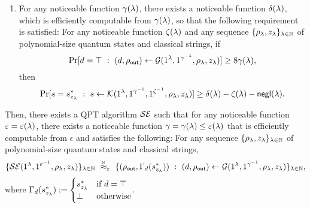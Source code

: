 \begin{lemma}
\begin{enumerate}
    \item \label{item:gamma_delta} 
 For any noticeable function $\gamma(\lambda)$, there exists a noticeable function $\delta(\lambda)$, 
 which is efficiently computable from $\gamma(\lambda)$, so that the following requirement is satisfied: For 
 any noticeable function $\zeta(\lambda)$ and
 any sequence $\{\rho_\lambda,{z_\lambda}\}_{\lambda\in\mathbb{N}}$ of polynomial-size quantum states and classical strings, %
 if 
$$
\Pr[d=\top ~:~ (d,\rho_{\mathsf{out}}) \leftarrow \mathcal{G}(1^\lambda,1^{\gamma^{-1}},\rho_\lambda,{z_\lambda})]\geq  8\gamma(\lambda), 
$$  
then 
$$
\Pr[s =s^*_{{z_\lambda}}~:~ s\leftarrow \mathcal{K}(1^\lambda,1^{\gamma^{-1}}, 1^{\zeta^{-1}}, \rho_\lambda,{z_\lambda})]\geq   \delta(\lambda)-\zeta(\lambda)-\mathsf{negl}(\lambda).
$$
\end{enumerate}
Then, there exists a QPT algorithm $\mathcal{SE}$ such that for any noticeable function $\varepsilon=\varepsilon(\lambda)$, there exists a noticeable function $\gamma=\gamma(\lambda)\le \varepsilon(\lambda)$ that is efficiently computable from $\epsilon$ and satisfies the following:
For any sequence $\{\rho_\lambda,{z_\lambda}\}_{\lambda\in\mathbb{N}}$ of polynomial-size quantum states and classical strings,  
$$
\{\mathcal{SE}(1^\lambda,1^{\varepsilon^{-1}},\rho_\lambda,{z_\lambda})\}_{\lambda \in \mathbb{N}}
~\stackrel{\text{s}}{\approx}_{\varepsilon}~ 
\{(\rho_{\mathsf{out}},\Gamma_d(s^*_{{z_\lambda}}))~:~(d,\rho_{\mathsf{out}})\leftarrow \mathcal{G}(1^\lambda,1^{\gamma^{-1}},\rho_\lambda,{z_{\lambda}})\}_{\lambda \in \mathbb{N}},
$$
where  $
\Gamma_d(s^*_{{z_\lambda}}):= 
\begin{cases}
s^*_{{z_\lambda}} & \text{if}~ d=\top \\
\bot & \text{otherwise}
\end{cases}
$.
\end{lemma}

